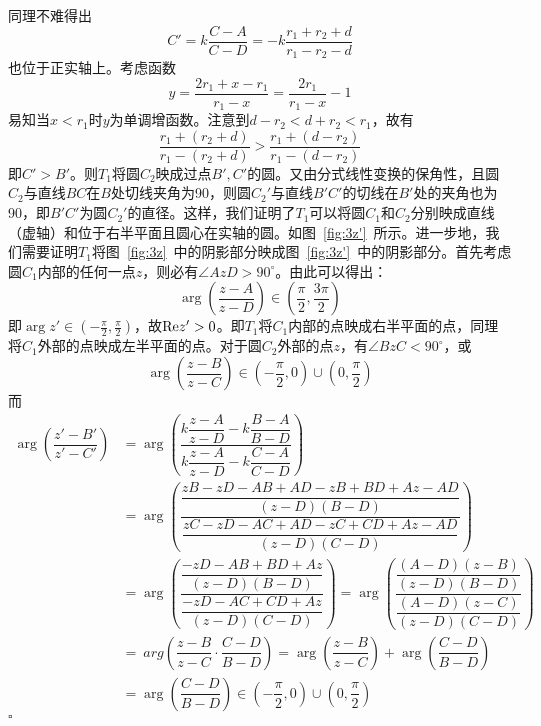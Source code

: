 \documentclass{article}
\newenvironment{SOLUTION}[1][{}]{{\noindent\heiti 解#1：}}{\hfill $\square$\par}
\begin{document}
\begin{SOLUTION}
    同理不难得出
    \begin{equation}
    C'=k\dfrac{C-A}{C-D}=-k\dfrac{r_1+r_2+d}{r_1-r_2-d}
    \label{equ:C'}
    \end{equation}
    也位于正实轴上。考虑函数
    $$y=\dfrac{2r_1+x-r_1}{r_1-x}=\dfrac{2r_1}{r_1-x}-1$$易知当$x<r_1$时$y$为单调增函数。注意到$d-r_2<d+r_2<r_1$，故有
    $$
    \dfrac{r_1+(r_2+d)}{r_1-(r_2+d)}>\dfrac{r_1+(d-r_2)}{r_1-(d-r_2)}
    $$
    即$C'>B'$。则$T_1$将圆$C_2$映成过点$B',C'$的圆。又由分式线性变换的保角性，且圆$C_2$与直线$BC$在$B$处切线夹角为90\textdegree，则圆$C_2'$与直线$B'C'$的切线在$B'$处的夹角也为90\textdegree，即$B'C'$为圆$C_2'$的直径。这样，我们证明了$T_1$可以将圆$C_1$和$C_2$分别映成直线（虚轴）和位于右半平面且圆心在实轴的圆。如图~\ref{fig:3z'}~所示。进一步地，我们需要证明$T_1$将图~\ref{fig:3z}~中的阴影部分映成图~\ref{fig:3z'}~中的阴影部分。首先考虑圆$C_1$内部的任何一点$z$，则必有$\angle AzD>90^\circ$。由此可以得出：
    \begin{equation}
        \arg \left(\dfrac{z-A}{z-D}\right)\in \left(\frac{\pi}{2},\frac{3\pi}{2}\right)
    \end{equation}
    即$\arg z'\in(-\frac{\pi}{2},\frac{\pi}{2})$，故${\rm Re} z'>0$。即$T_1$将$C_1$内部的点映成右半平面的点，同理将$C_1$外部的点映成左半平面的点。对于圆$C_2$外部的点$z$，有$\angle BzC<90^\circ$，或
    \begin{equation}
        \arg\left(\dfrac{z-B}{z-C}\right)\in \left(-\dfrac{\pi}{2},0\right)\cup\left(0, \dfrac{\pi}{2}\right)
    \end{equation}
    而
    \begin{equation}
        \begin{split}
            \arg\left(\dfrac{z'-B'}{z'-C'}\right)&=\arg\left(\dfrac{k\dfrac{z-A}{z-D}-k\dfrac{B-A}{B-D}}{k\dfrac{z-A}{z-D}-k\dfrac{C-A}{C-D}}\right)\\
            &=\arg\left(\dfrac{\dfrac{zB-zD-AB+AD-zB+BD+Az-AD}{(z-D)(B-D)}}{\dfrac{zC-zD-AC+AD-zC+CD+Az-AD}{(z-D)(C-D)}}\right)\\
            &=\arg\left(\dfrac{\dfrac{-zD-AB+BD+Az}{(z-D)(B-D)}}{\dfrac{-zD-AC+CD+Az}{(z-D)(C-D)}}\right)=\arg\left(\dfrac{\dfrac{(A-D)(z-B)}{(z-D)(B-D)}}{\dfrac{(A-D)(z-C)}{(z-D)(C-D)}}\right)\\
            &=\
            arg\left(\dfrac{z-B}{z-C}\cdot\dfrac{C-D}{B-D}\right)=\arg\left(\dfrac{z-B}{z-C}\right)+\arg\left(\dfrac{C-D}{B-D}\right)\\
            &=\arg\left(\dfrac{C-D}{B-D}\right)\in  \left(-\dfrac{\pi}{2},0\right)\cup\left(0, \dfrac{\pi}{2}\right)

\end{split}
\end{equation}
\end{SOLUTION}
\end{document}
